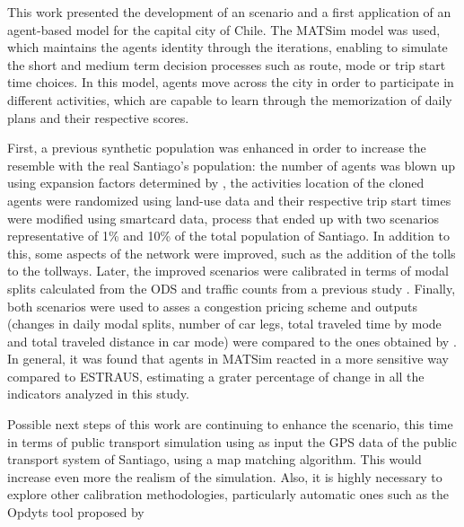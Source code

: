 \documentclass[Journal,letterpaper]{ascelike-new}
\begin{document}
This work presented the development of an scenario and a first application of an agent-based model for the capital city of Chile. The MATSim model was used, which maintains the agents identity through the iterations, enabling to simulate the short and medium term decision processes such as route, mode or trip start time choices. In this model, agents move across the city in order to participate in different activities, which are capable to learn through the memorization of daily plans and their respective scores. 

First, a previous synthetic population \citep{MATSimSantiago} was enhanced in order to increase the resemble with the real Santiago's population: the number of agents was blown up using expansion factors determined by \cite{Contreras2015}, the activities location of the cloned agents were randomized using land-use data and their respective trip start times were modified using smartcard data, process that ended up with two scenarios representative of 1\% and 10\% of the total population of Santiago. In addition to this, some aspects of the network were improved, such as the addition of the tolls to the tollways. Later, the improved scenarios were calibrated in terms of modal splits calculated from the ODS and traffic counts from a previous study \citep{AFOROS2013}. Finally, both scenarios were used to asses a congestion pricing scheme and outputs (changes in daily modal splits, number of car legs, total traveled time by mode and total traveled distance in car mode) were compared to the ones obtained by \cite{gleave2009tarificacion}. In general, it was found that agents in MATSim reacted in a more sensitive way compared to ESTRAUS,  estimating a grater percentage of change in all the indicators analyzed in this study. 

Possible next steps of this work are continuing to enhance the scenario, this time in terms of public transport simulation using as input the GPS data of the public transport system of Santiago, using a map matching algorithm. This would increase even more the realism of the simulation. Also, it is highly necessary to explore other calibration methodologies, particularly automatic ones such as the Opdyts tool proposed by \cite{flotterod2017search}


\appendix
%
%
\end{document}
